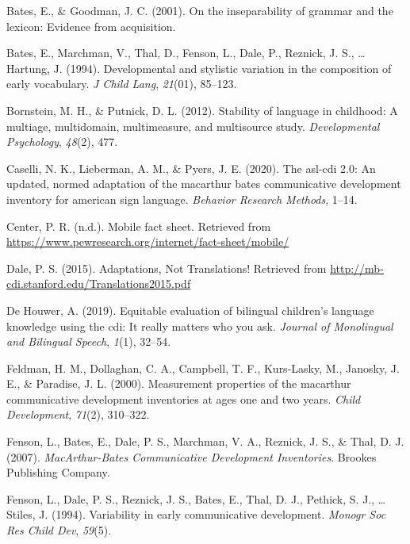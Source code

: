 \documentclass[
  english,
  ,man,floatsintext]{apa6}
\begin{document}
\leavevmode\hypertarget{ref-Bates2001}{}%
Bates, E., \& Goodman, J. C. (2001). On the inseparability of grammar and the lexicon: Evidence from acquisition.

\leavevmode\hypertarget{ref-bates1994}{}%
Bates, E., Marchman, V., Thal, D., Fenson, L., Dale, P., Reznick, J. S., \ldots{} Hartung, J. (1994). Developmental and stylistic variation in the composition of early vocabulary. \emph{J Child Lang}, \emph{21}(01), 85--123.

\leavevmode\hypertarget{ref-bornstein2012}{}%
Bornstein, M. H., \& Putnick, D. L. (2012). Stability of language in childhood: A multiage, multidomain, multimeasure, and multisource study. \emph{Developmental Psychology}, \emph{48}(2), 477.

\leavevmode\hypertarget{ref-Caselli2020}{}%
Caselli, N. K., Lieberman, A. M., \& Pyers, J. E. (2020). The asl-cdi 2.0: An updated, normed adaptation of the macarthur bates communicative development inventory for american sign language. \emph{Behavior Research Methods}, 1--14.

\leavevmode\hypertarget{ref-Center2019}{}%
Center, P. R. (n.d.). Mobile fact sheet. Retrieved from \url{https://www.pewresearch.org/internet/fact-sheet/mobile/}

\leavevmode\hypertarget{ref-dale2015}{}%
Dale, P. S. (2015). Adaptations, Not Translations! Retrieved from \url{http://mb-cdi.stanford.edu/Translations2015.pdf}

\leavevmode\hypertarget{ref-DeHouwer2019}{}%
De Houwer, A. (2019). Equitable evaluation of bilingual children's language knowledge using the cdi: It really matters who you ask. \emph{Journal of Monolingual and Bilingual Speech}, \emph{1}(1), 32--54.

\leavevmode\hypertarget{ref-feldman2000}{}%
Feldman, H. M., Dollaghan, C. A., Campbell, T. F., Kurs-Lasky, M., Janosky, J. E., \& Paradise, J. L. (2000). Measurement properties of the macarthur communicative development inventories at ages one and two years. \emph{Child Development}, \emph{71}(2), 310--322.

\leavevmode\hypertarget{ref-fenson2007}{}%
Fenson, L., Bates, E., Dale, P. S., Marchman, V. A., Reznick, J. S., \& Thal, D. J. (2007). \emph{MacArthur-Bates Communicative Development Inventories}. Brookes Publishing Company.

\leavevmode\hypertarget{ref-fenson1994}{}%
Fenson, L., Dale, P. S., Reznick, J. S., Bates, E., Thal, D. J., Pethick, S. J., \ldots{} Stiles, J. (1994). Variability in early communicative development. \emph{Monogr Soc Res Child Dev}, \emph{59}(5).
\end{document}
